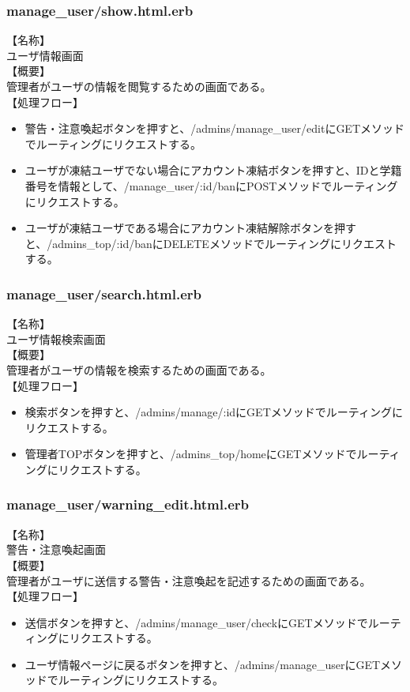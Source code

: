 \documentclass[a4j]{jarticle}
\begin{document}
\subsubsection{manage\_user/show.html.erb}
\noindent
【名称】\\
ユーザ情報画面\\
【概要】\\
管理者がユーザの情報を閲覧するための画面である。\\
【処理フロー】
\begin{itemize}
  \item 警告・注意喚起ボタンを押すと、/admins/manage\_user/editにGETメソッドでルーティングにリクエストする。
  \item ユーザが凍結ユーザでない場合にアカウント凍結ボタンを押すと、IDと学籍番号を情報として、/manage\_user/:id/banにPOSTメソッドでルーティングにリクエストする。
  \item ユーザが凍結ユーザである場合にアカウント凍結解除ボタンを押すと、/admins\_top/:id/banにDELETEメソッドでルーティングにリクエストする。
\end{itemize}

\subsubsection{manage\_user/search.html.erb}
\noindent
【名称】\\
ユーザ情報検索画面\\
【概要】\\
管理者がユーザの情報を検索するための画面である。\\
【処理フロー】
\begin{itemize}
  \item 検索ボタンを押すと、/admins/manage/:idにGETメソッドでルーティングにリクエストする。
  \item 管理者TOPボタンを押すと、/admins\_top/homeにGETメソッドでルーティングにリクエストする。
\end{itemize}

\subsubsection{manage\_user/warning\_edit.html.erb}
\noindent
【名称】\\
警告・注意喚起画面\\
【概要】\\
管理者がユーザに送信する警告・注意喚起を記述するための画面である。\\
【処理フロー】
\begin{itemize}
  \item 送信ボタンを押すと、/admins/manage\_user/checkにGETメソッドでルーティングにリクエストする。
  \item ユーザ情報ページに戻るボタンを押すと、/admins/manage\_userにGETメソッドでルーティングにリクエストする。
\end{itemize}
\end{document}
